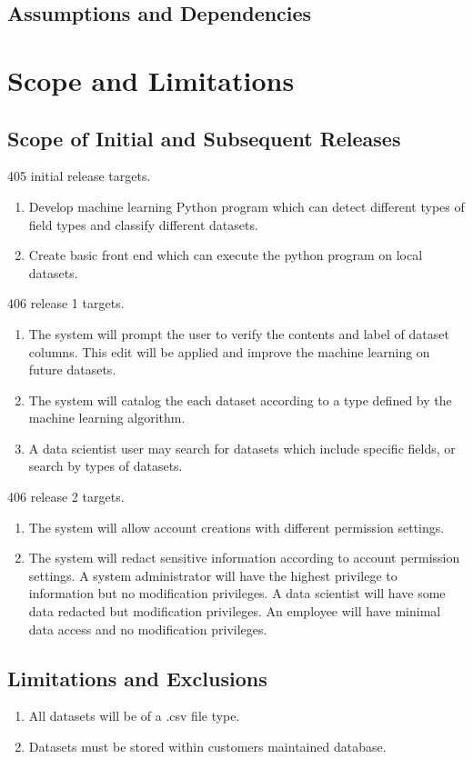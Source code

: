 \documentclass[12pt,oneside,letterpaper]{article}
\begin{document}
\subsection{Assumptions and Dependencies}



\newpage
\section{Scope and Limitations}
\subsection{Scope of Initial and Subsequent Releases}
405 initial release targets.
\begin{enumerate}
    \item Develop machine learning Python program which can detect different types of field types and classify different datasets.
    \item Create basic front end which can execute the python program on local datasets.
\end{enumerate}  
406 release 1 targets.
\begin{enumerate}
    \item The system will prompt the user to verify the contents and label of dataset columns. This edit will be applied and improve the machine learning on future datasets.
    \item The system will catalog the each dataset according to a type defined by the machine learning algorithm.
    \item A data scientist user may search for datasets which include specific fields, or search by types of datasets.
\end{enumerate}
406 release 2 targets.
\begin{enumerate}
    \item The system will allow account creations with different permission settings.
    \item The system will redact sensitive information according to account permission settings. A system administrator will have the highest privilege to information but no modification privileges. A data scientist will have some data redacted but modification privileges. An employee will have minimal data access and no modification privileges.
\end{enumerate}
\subsection{Limitations and Exclusions}
\begin{enumerate}
    \item All datasets will be of a .csv file type.
    \item Datasets must be stored within customers maintained database.
\end{enumerate}
\end{document}
